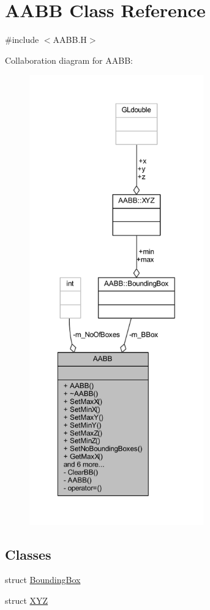\hypertarget{class_a_a_b_b}{}\section{A\+A\+BB Class Reference}
\label{class_a_a_b_b}


{\ttfamily \#include $<$A\+A\+B\+B.\+H$>$}



Collaboration diagram for A\+A\+BB\+:
\nopagebreak
\begin{figure}[H]
\begin{center}
\leavevmode
\includegraphics[height=550pt]{class_a_a_b_b__coll__graph}
\end{center}
\end{figure}
\subsection*{Classes}
\begin{DoxyCompactItemize}
\item 
struct \hyperlink{struct_a_a_b_b_1_1_bounding_box}{Bounding\+Box}
\item 
struct \hyperlink{struct_a_a_b_b_1_1_x_y_z}{X\+YZ}
\end{DoxyCompactItemize}
